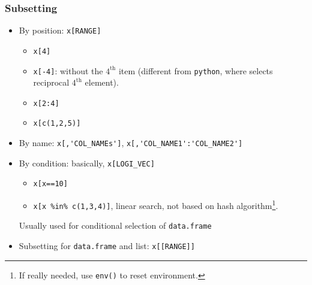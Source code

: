 \subsubsection{Subsetting}
\begin{itemize}[topsep=2pt,itemsep=0pt]
    \item By position: \lstinline|x[RANGE]|
    \begin{itemize}[topsep=2pt,itemsep=0pt]
        \item \lstinline|x[4]|
        \item \lstinline|x[-4]|: without the $ 4^\mathrm{th} $ item (different from \lstinline|python|, where selects reciprocal $ \mathrm{4^{th}}  $ element).
        \item \lstinline|x[2:4]|
        \item \lstinline|x[c(1,2,5)]|
    \end{itemize}
    \item By name: \lstinline|x[,'COL_NAMEs']|, \lstinline|x[,'COL_NAME1':'COL_NAME2']|
    \item By condition: basically, \lstinline|x[LOGI_VEC]|
    \begin{itemize}[topsep=2pt,itemsep=0pt]
        \item \lstinline|x[x==10]|
        \item \lstinline|x[x %in% c(1,3,4)]|, linear search, not based on hash algorithm\footnote{If really needed, use \lstinline|env()| to reset environment.}.
    \end{itemize}

    Usually used for conditional selection of \lstinline|data.frame|
    \item Subsetting for \lstinline|data.frame| and list: \lstinline|x[[RANGE]]|



\end{itemize}
